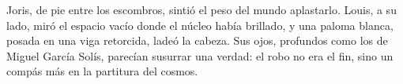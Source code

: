 Joris, de pie entre los escombros, sintió el peso del mundo aplastarlo. Louis, a su lado, miró el espacio vacío donde el núcleo había brillado, y una paloma blanca, posada en una viga retorcida, ladeó la cabeza. Sus ojos, profundos como los de Miguel García Solís, parecían susurrar una verdad: el robo no era el fin, sino un compás más en la partitura del cosmos.
